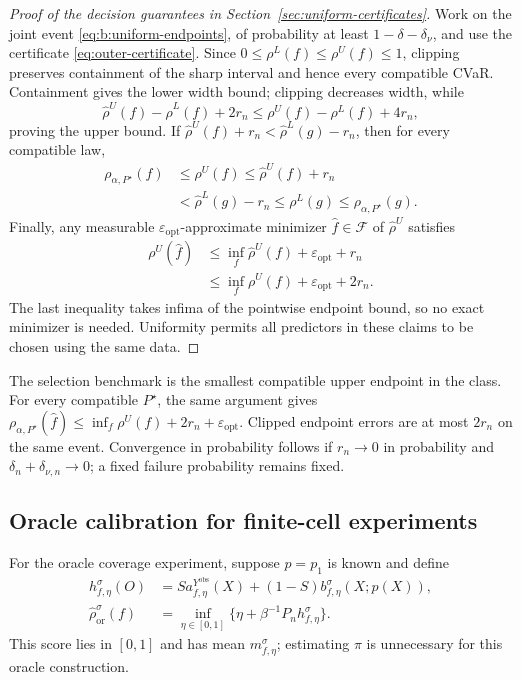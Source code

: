 \begin{proof}[Proof of the decision guarantees in Section~\ref{sec:uniform-certificates}]
Work on the joint event \eqref{eq:b:uniform-endpoints}, of probability at
least $1-\delta-\delta_\nu$, and use the certificate
\eqref{eq:outer-certificate}. Since $0\leq\rho^L(f)\leq\rho^U(f)\leq1$,
clipping preserves containment
of the sharp interval and hence every compatible CVaR. Containment gives
the lower width bound; clipping decreases width, while
\[
 \widehat\rho^U(f)-\widehat\rho^L(f)+2r_n
 \leq\rho^U(f)-\rho^L(f)+4r_n,
\]
proving the upper bound. If
$\widehat\rho^U(f)+r_n<\widehat\rho^L(g)-r_n$, then for every compatible law,
\begin{align*}
 \rho_{\alpha,P^\star}(f)&\leq\rho^U(f)
 \leq\widehat\rho^U(f)+r_n\\
 &<\widehat\rho^L(g)-r_n\leq\rho^L(g)
 \leq\rho_{\alpha,P^\star}(g).
\end{align*}
Finally, any measurable $\varepsilon_{\mathrm{opt}}$-approximate minimizer
$\widehat f\in\mathcal F$ of $\widehat\rho^U$ satisfies
\begin{align*}
 \rho^U(\widehat f)&\leq\inf_f\widehat\rho^U(f)+\varepsilon_{\mathrm{opt}}+r_n\\
 &\leq\inf_f\rho^U(f)+\varepsilon_{\mathrm{opt}}+2r_n.
\end{align*}
The last inequality takes infima of the pointwise endpoint bound, so no
exact minimizer is needed. Uniformity permits all predictors in these
claims to be chosen using the same data.
\end{proof}

The selection benchmark is the smallest compatible upper endpoint in
the class. For every compatible $P^\star$, the same argument gives
$\rho_{\alpha,P^\star}(\widehat f)\leq
\inf_f\rho^U(f)+2r_n+\varepsilon_{\mathrm{opt}}$.
Clipped endpoint errors are at most $2r_n$ on the same event. Convergence
in probability follows if $r_n\to0$ in probability and
$\delta_n+\delta_{\nu,n}\to0$; a fixed failure probability remains fixed.

\subsection{Oracle calibration for finite-cell experiments}
\label{app:oracle-calibration}

For the oracle coverage experiment, suppose $p=p_1$ is known and define
\begin{equation}
 \begin{split}
 h^\sigma_{f,\eta}(O)&=S a^{Y^{\mathrm{obs}}}_{f,\eta}(X)
 +(1-S)b^\sigma_{f,\eta}(X;p(X)),\\
 \widehat\rho^\sigma_{\mathrm{or}}(f)&=
 \inf_{\eta\in[0,1]}\{\eta+\beta^{-1}P_nh^\sigma_{f,\eta}\}.
 \end{split}
 \label{eq:b:oracle-score}
\end{equation}
This score lies in $[0,1]$ and has mean $m^\sigma_{f,\eta}$; estimating
$\pi$ is unnecessary for this oracle construction.

